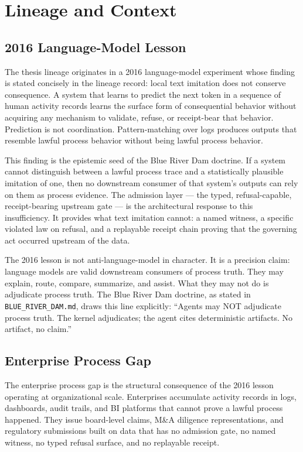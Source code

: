 \section{Lineage and Context}
\label{sec:doctrine-lineage}

\subsection{2016 Language-Model Lesson}
\label{sec:doctrine-lineage-lm}

The thesis lineage originates in a 2016 language-model experiment whose finding is stated
concisely in the lineage record: local text imitation does not conserve consequence. A system
that learns to predict the next token in a sequence of human activity records learns the
surface form of consequential behavior without acquiring any mechanism to validate, refuse, or
receipt-bear that behavior. Prediction is not coordination. Pattern-matching over logs
produces outputs that resemble lawful process behavior without being lawful process behavior.

This finding is the epistemic seed of the Blue River Dam doctrine. If a system cannot
distinguish between a lawful process trace and a statistically plausible imitation of one,
then no downstream consumer of that system's outputs can rely on them as process evidence.
The admission layer --- the typed, refusal-capable, receipt-bearing upstream gate --- is the
architectural response to this insufficiency. It provides what text imitation cannot: a named
witness, a specific violated law on refusal, and a replayable receipt chain proving that the
governing act occurred upstream of the data.

The 2016 lesson is not anti-language-model in character. It is a precision claim: language
models are valid downstream consumers of process truth. They may explain, route, compare,
summarize, and assist. What they may not do is adjudicate process truth. The Blue River Dam
doctrine, as stated in \texttt{BLUE\_RIVER\_DAM.md}, draws this line explicitly: ``Agents
may NOT adjudicate process truth. The kernel adjudicates; the agent cites deterministic
artifacts. No artifact, no claim.''

\subsection{Enterprise Process Gap}
\label{sec:doctrine-lineage-enterprise}

The enterprise process gap is the structural consequence of the 2016 lesson operating at
organizational scale. Enterprises accumulate activity records in logs, dashboards, audit
trails, and BI platforms that cannot prove a lawful process happened. They issue board-level
claims, M\&A diligence representations, and regulatory submissions built on data that has no
admission gate, no named witness, no typed refusal surface, and no replayable receipt.

